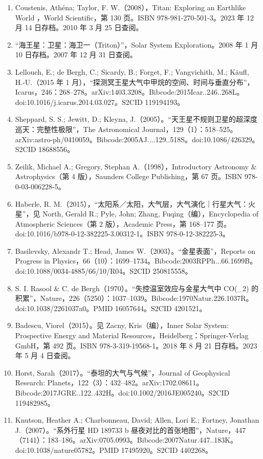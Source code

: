 \begin{enumerate}
\item Coustenis, Athéna; Taylor, F. W.（2008），Titan: Exploring an Earthlike World
，World Scientific，第 130 页。ISBN 978-981-270-501-3。2023 年 12 月 14 日存档。2010 年 3 月 25 日查阅。
\item “海王星：卫星：海卫一（Triton）”，Solar System Exploration。2008 年 1 月 10 日存档。2007 年 12 月 31 日查阅。
\item Lellouch, E.; de Bergh, C.; Sicardy, B.; Forget, F.; Vangvichith, M.; Käufl, H.-U.（2015 年 1 月），“探测冥王星大气中甲烷的空间、时间与垂直分布”，Icarus，246：268–278。arXiv:1403.3208。Bibcode:2015Icar..246..268L。doi:10.1016/j.icarus.2014.03.027。S2CID 119194193。
\item Sheppard, S. S.; Jewitt, D.; Kleyna, J.（2005）。“天王星不规则卫星的超深度巡天：完整性极限”，The Astronomical Journal，129（1）：518–525。arXiv:astro-ph/0410059。Bibcode:2005AJ....129..518S。doi:10.1086/426329。S2CID 18688556。
\item Zeilik, Michael A.; Gregory, Stephan A.（1998），Introductory Astronomy & Astrophysics（第 4 版），Saunders College Publishing，第 67 页。ISBN 978-0-03-006228-5。
\item Haberle, R. M.（2015），“太阳系／太阳，大气层，大气演化｜行星大气：火星”，见 North, Gerald R.; Pyle, John; Zhang, Fuqing（编），Encyclopedia of Atmospheric Sciences（第 2 版），Academic Press，第 168–177 页。doi:10.1016/b978-0-12-382225-3.00312-1。ISBN 978-0-12-382225-3。
\item Basilevsky, Alexandr T.; Head, James W.（2003）。“金星表面”，Reports on Progress in Physics，66（10）：1699–1734。Bibcode:2003RPPh...66.1699B。doi:10.1088/0034-4885/66/10/R04。S2CID 250815558。
\item S. I. Rasool & C. de Bergh（1970）。“失控温室效应与金星大气中 CO(_2) 的积累”，Nature，226（5250）：1037–1039。Bibcode:1970Natur.226.1037R。doi:10.1038/2261037a0。PMID 16057644。S2CID 4201521。
\item Badescu, Viorel（2015）。见 Zacny, Kris（编），Inner Solar System: Prospective Energy and Material Resources，Heidelberg：Springer-Verlag GmbH，第 492 页。ISBN 978-3-319-19568-1。2018 年 8 月 21 日存档。2023 年 5 月 4 日查阅。
\item Horst, Sarah（2017）。“泰坦的大气与气候”，Journal of Geophysical Research: Planets，122（3）：432–482。arXiv:1702.08611。Bibcode:2017JGRE..122..432H。doi:10.1002/2016JE005240。S2CID 119482985。
\item Knutson, Heather A.; Charbonneau, David; Allen, Lori E.; Fortney, Jonathan J.（2007）。“系外行星 HD 189733 b 昼夜对比的首张地图”，Nature，447（7141）：183–186。arXiv:0705.0993。Bibcode:2007Natur.447..183K。doi:10.1038/nature05782。PMID 17495920。S2CID 4402268。

\end{enumerate}
